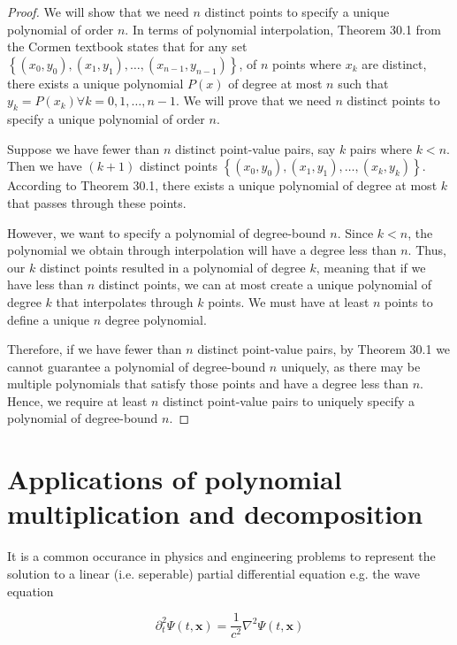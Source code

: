 \documentclass{article}
\renewcommand{\_}{\ifincsname_\else\legacyunderscore\fi}
\begin{document}
\begin{proof}
We will show that we need $n$ distinct points to specify a unique polynomial of order $n$. In terms of polynomial interpolation, Theorem 30.1 from the Cormen textbook states that for any set $\left\{ (x_0, y_0), (x_1, y_1), \hdots,(x_{n-1}, y_{n-1})\right\}$, of $n$ points where $x_k$ are distinct, there exists a unique polynomial $P(x)$ of degree at most $n$ such that $y_k=P(x_k) \forall k=0, 1, \hdots, n-1$. We will prove that we need $n$ distinct points to specify a unique polynomial of order $n$.

Suppose we have fewer than $n$ distinct point-value pairs, say $k$ pairs where $k < n$. Then we have $(k+1)$ distinct points $\left\{(x_0, y_0), (x_1, y_1), \hdots, (x_k, y_k)\right\}$. According to Theorem 30.1, there exists a unique polynomial of degree at most $k$ that passes through these points.

However, we want to specify a polynomial of degree-bound $n$. Since $k < n$, the polynomial we obtain through interpolation will have a degree less than $n$. Thus, our $k$ distinct points resulted in a polynomial of degree $k$, meaning that if we have less than $n$ distinct points, we can at most create a unique polynomial of degree $k$ that interpolates through $k$ points. We must have at least $n$ points to define a unique $n$ degree polynomial.  

Therefore, if we have fewer than $n$ distinct point-value pairs, by Theorem 30.1 we cannot guarantee a polynomial of degree-bound $n$ uniquely, as there may be multiple polynomials that satisfy those points and have a degree less than $n$. Hence, we require at least $n$ distinct point-value pairs to uniquely specify a polynomial of degree-bound $n$.
\end{proof}

\pagebreak

    \section*{Applications of polynomial multiplication and decomposition}

    It is a common occurance in physics and engineering problems to represent the solution to a linear (i.e. seperable) partial differential equation e.g. the wave equation

    \begin{equation}
        \partial_t^2 \Psi(t, \mathbf{x}) = \frac{1}{c^2} \nabla^2 \Psi(t, \mathbf{x})
    \end{equation}
\end{document}
